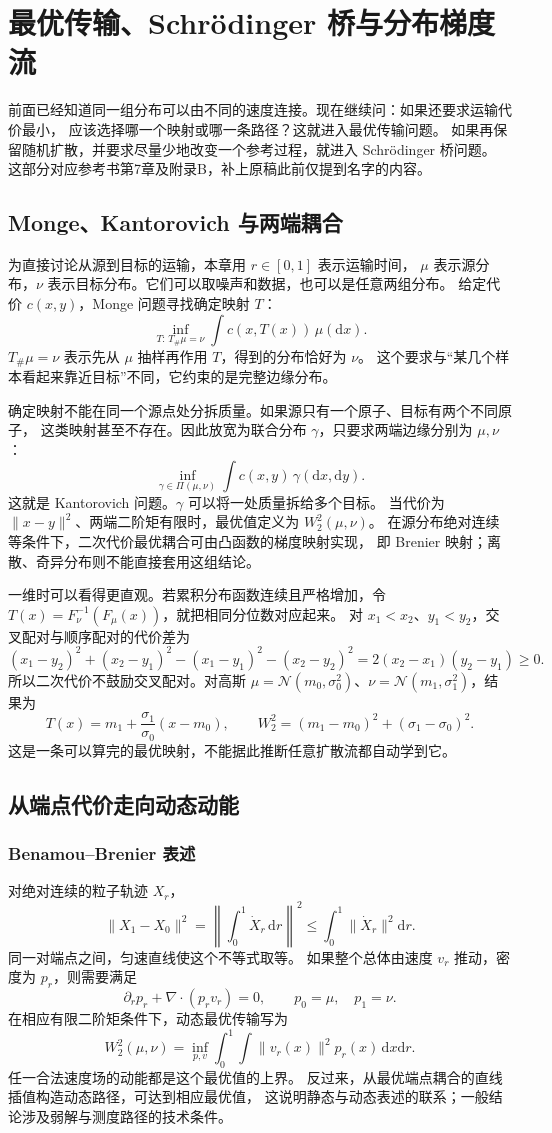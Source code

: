 \chapter{最优传输、Schrödinger 桥与分布梯度流}
\label{supp:transport}

前面已经知道同一组分布可以由不同的速度连接。现在继续问：如果还要求运输代价最小，
应该选择哪一个映射或哪一条路径？这就进入最优传输问题。
如果再保留随机扩散，并要求尽量少地改变一个参考过程，就进入 Schrödinger 桥问题。
这部分对应参考书第7章及附录B，补上原稿此前仅提到名字的内容。\cite{theorybook}

\section{Monge、Kantorovich 与两端耦合}
为直接讨论从源到目标的运输，本章用 $r\in[0,1]$ 表示运输时间，
$\mu$ 表示源分布，$\nu$ 表示目标分布。它们可以取噪声和数据，也可以是任意两组分布。
给定代价 $c(x,y)$，Monge 问题寻找确定映射 $T$：
\[
\inf_{T:\,T_\#\mu=\nu}\int c(x,T(x))\,\mu(\mathrm dx).
\]
$T_\#\mu=\nu$ 表示先从 $\mu$ 抽样再作用 $T$，得到的分布恰好为 $\nu$。
这个要求与“某几个样本看起来靠近目标”不同，它约束的是完整边缘分布。

确定映射不能在同一个源点处分拆质量。如果源只有一个原子、目标有两个不同原子，
这类映射甚至不存在。因此放宽为联合分布 $\gamma$，只要求两端边缘分别为 $\mu,\nu$：
\[
\inf_{\gamma\in\Pi(\mu,\nu)}\int c(x,y)\,\gamma(\mathrm dx,\mathrm dy).
\]
这就是 Kantorovich 问题。$\gamma$ 可以将一处质量拆给多个目标。
当代价为 $\|x-y\|^2$、两端二阶矩有限时，最优值定义为 $W_2^2(\mu,\nu)$。
在源分布绝对连续等条件下，二次代价最优耦合可由凸函数的梯度映射实现，
即 Brenier 映射；离散、奇异分布则不能直接套用这组结论。

一维时可以看得更直观。若累积分布函数连续且严格增加，令
$T(x)=F_\nu^{-1}(F_\mu(x))$，就把相同分位数对应起来。
对 $x_1<x_2$、$y_1<y_2$，交叉配对与顺序配对的代价差为
\[
(x_1-y_2)^2+(x_2-y_1)^2
 -(x_1-y_1)^2-(x_2-y_2)^2
=2(x_2-x_1)(y_2-y_1)\geq0.
\]
所以二次代价不鼓励交叉配对。对高斯
$\mu=\mathcal N(m_0,\sigma_0^2)$、$\nu=\mathcal N(m_1,\sigma_1^2)$，结果为
\[
T(x)=m_1+\frac{\sigma_1}{\sigma_0}(x-m_0),\qquad
W_2^2=(m_1-m_0)^2+(\sigma_1-\sigma_0)^2.
\]
这是一条可以算完的最优映射，不能据此推断任意扩散流都自动学到它。

\section{从端点代价走向动态动能}
\subsection{Benamou--Brenier 表述}
对绝对连续的粒子轨迹 $X_r$，
\[
\|X_1-X_0\|^2=\left\|\int_0^1\dot X_r\,\mathrm dr\right\|^2
\leq\int_0^1\|\dot X_r\|^2\mathrm dr.
\]
同一对端点之间，匀速直线使这个不等式取等。
如果整个总体由速度 $v_r$ 推动，密度为 $p_r$，则需要满足
\[
\partial_rp_r+\nabla\cdot(p_rv_r)=0,\qquad p_0=\mu,\quad p_1=\nu.
\]
在相应有限二阶矩条件下，动态最优传输写为
\[
W_2^2(\mu,\nu)=\inf_{p,v}
 \int_0^1\int\|v_r(x)\|^2p_r(x)\,\mathrm dx\mathrm dr.
\label{supp:bb}
\]
任一合法速度场的动能都是这个最优值的上界。
反过来，从最优端点耦合的直线插值构造动态路径，可达到相应最优值，
这说明静态与动态表述的联系；一般结论涉及弱解与测度路径的技术条件。

